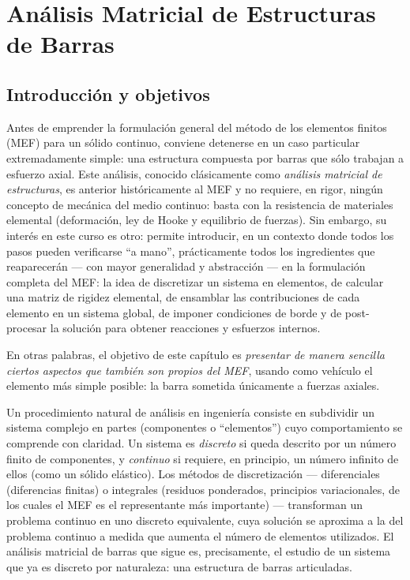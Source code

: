 \chapter{Análisis Matricial de Estructuras de Barras}
\label{cap:cap04-analisis-matricial-barras}

\section{Introducción y objetivos}

Antes de emprender la formulación general del método de los elementos finitos (MEF) para un sólido continuo, conviene detenerse en un caso particular extremadamente simple: una estructura compuesta por barras que sólo trabajan a esfuerzo axial. Este análisis, conocido clásicamente como \emph{análisis matricial de estructuras}, es anterior históricamente al MEF y no requiere, en rigor, ningún concepto de mecánica del medio continuo: basta con la resistencia de materiales elemental (deformación, ley de Hooke y equilibrio de fuerzas). Sin embargo, su interés en este curso es otro: permite introducir, en un contexto donde todos los pasos pueden verificarse ``a mano'', prácticamente todos los ingredientes que reaparecerán --- con mayor generalidad y abstracción --- en la formulación completa del MEF: la idea de discretizar un sistema en elementos, de calcular una matriz de rigidez elemental, de ensamblar las contribuciones de cada elemento en un sistema global, de imponer condiciones de borde y de post-procesar la solución para obtener reacciones y esfuerzos internos.

En otras palabras, el objetivo de este capítulo es \emph{presentar de manera sencilla ciertos aspectos que también son propios del MEF}, usando como vehículo el elemento más simple posible: la barra sometida únicamente a fuerzas axiales.

\begin{observacion}
Un procedimiento natural de análisis en ingeniería consiste en subdividir un sistema complejo en partes (componentes o ``elementos'') cuyo comportamiento se comprende con claridad. Un sistema es \emph{discreto} si queda descrito por un número finito de componentes, y \emph{continuo} si requiere, en principio, un número infinito de ellos (como un sólido elástico). Los métodos de discretización --- diferenciales (diferencias finitas) o integrales (residuos ponderados, principios variacionales, de los cuales el MEF es el representante más importante) --- transforman un problema continuo en uno discreto equivalente, cuya solución se aproxima a la del problema continuo a medida que aumenta el número de elementos utilizados. El análisis matricial de barras que sigue es, precisamente, el estudio de un sistema que ya es discreto por naturaleza: una estructura de barras articuladas.
\end{observacion}

